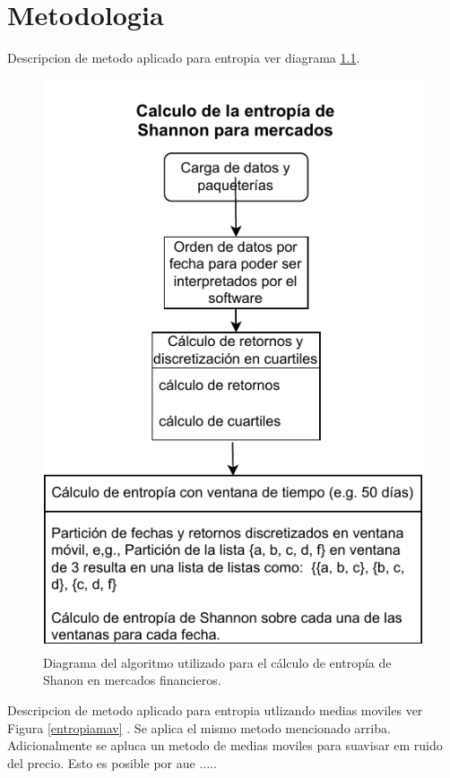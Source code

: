 %
\chapter{Metodologia}
\label{Metodologia}

Descripcion de metodo aplicado para entropia  ver diagrama \ref{diagramaentropia1}.


\begin{figure}
	\includegraphics[width=0.7\linewidth]{figures/diagrama_entropia1}
	\caption{Diagrama del algoritmo utilizado para el c\'alculo de entrop\'ia de Shanon en mercados financieros.}
	\label{diagramaentropia1}
\end{figure}


Descripcion de metodo aplicado para entropia utlizando medias moviles ver Figura \ref{entropiamav} . 
Se aplica el mismo metodo mencionado arriba. Adicionalmente se apluca un metodo de medias moviles para suavisar em ruido del precio. Esto es posible por aue .....



